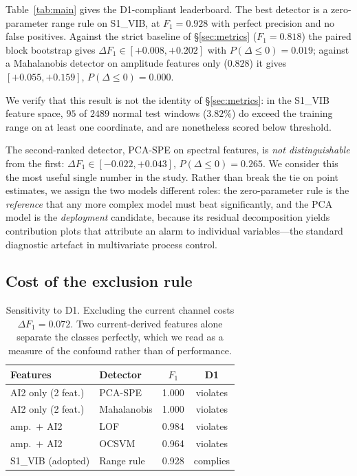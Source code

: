 \documentclass[twocolumn,10pt]{article}
\begin{document}
Table~\ref{tab:main} gives the D1-compliant leaderboard. The best detector is a
zero-parameter range rule on \textsf{S1\_VIB}, at $F_1 = 0.928$ with perfect
precision and no false positives. Against the strict baseline of
\S\ref{sec:metrics} ($F_1 = 0.818$) the paired block bootstrap gives
$\Delta F_1 \in [+0.008, +0.202]$ with $P(\Delta \leq 0) = 0.019$; against a
Mahalanobis detector on amplitude features only ($0.828$) it gives
$[+0.055, +0.159]$, $P(\Delta\leq0)=0.000$.

We verify that this result is not the identity of \S\ref{sec:metrics}: in the
\textsf{S1\_VIB} feature space, $95$ of $2489$ normal test windows ($3.82\%$)
do exceed the training range on at least one coordinate, and are nonetheless
scored below threshold.

The second-ranked detector, PCA-SPE on spectral features, is
\emph{not distinguishable} from the first: $\Delta F_1 \in [-0.022, +0.043]$,
$P(\Delta\leq0)=0.265$. We consider this the most useful single number in the
study. Rather than break the tie on point estimates, we assign the two models
different roles: the zero-parameter rule is the \emph{reference} that any more
complex model must beat significantly, and the PCA model is the
\emph{deployment} candidate, because its residual decomposition yields
contribution plots that attribute an alarm to individual variables---the
standard diagnostic artefact in multivariate process control.

\subsection{Cost of the exclusion rule}

\begin{table}[t]
\centering\small
\caption{Sensitivity to D1. Excluding the current channel costs
$\Delta F_1 = 0.072$. Two current-derived features alone separate the classes
perfectly, which we read as a measure of the confound rather than of
performance.}
\label{tab:d1}
\begin{tabular}{llcc}
\toprule
Features & Detector & $F_1$ & D1 \\
\midrule
\textsf{AI2} only (2 feat.) & PCA-SPE & 1.000 & violates \\
\textsf{AI2} only (2 feat.) & Mahalanobis & 1.000 & violates \\
amp.\ $+$ \textsf{AI2} & LOF & 0.984 & violates \\
amp.\ $+$ \textsf{AI2} & OCSVM & 0.964 & violates \\
\midrule
\textsf{S1\_VIB} (adopted) & Range rule & 0.928 & complies \\
\bottomrule
\end{tabular}
\end{table}
\end{document}

